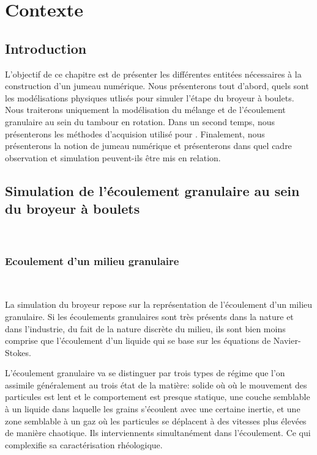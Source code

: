 
\chapter{Contexte}

\section{Introduction}

L'objectif de ce chapitre est de présenter les différentes entitées nécessaires à la construction d'un jumeau numérique. Nous présenterons tout d'abord, quels sont les modélisations physiques utlisés pour simuler l'étape du broyeur à boulets. Nous traiterons uniquement la modélisation du mélange et de l'écoulement granulaire au sein du tambour en rotation. Dans un second temps, nous présenterons les méthodes d'acquision utilisé pour . Finalement, nous présenterons la notion de jumeau numérique et présenterons dans quel cadre observation et simulation peuvent-ils être mis en relation.

\section{Simulation de l'écoulement granulaire au sein du broyeur à boulets}~\label{sec:simu_broyeur}

\subsection{Ecoulement d'un milieu granulaire}~\label{sec:simu_granulaire}

La simulation du broyeur repose sur la représentation de l'écoulement d'un milieu granulaire. Si les écoulements granulaires sont très présents dans la nature et dans l'industrie, du fait de la nature discrète du milieu, ils sont bien moins comprise que l'écoulement d'un liquide qui se base sur les équations de Navier-Stokes.

L'écoulement granulaire va se distinguer par trois types de régime que l'on assimile généralement au trois état de la matière: solide où où le mouvement des particules est lent et le comportement est presque statique, une couche semblable à un liquide dans laquelle les grains s'écoulent avec une certaine inertie, et une zone semblable à un gaz où les particules se déplacent à des vitesses plus élevées de manière chaotique. Ils interviennents simultanément dans l'écoulement. Ce qui complexifie sa caractérisation rhéologique.


